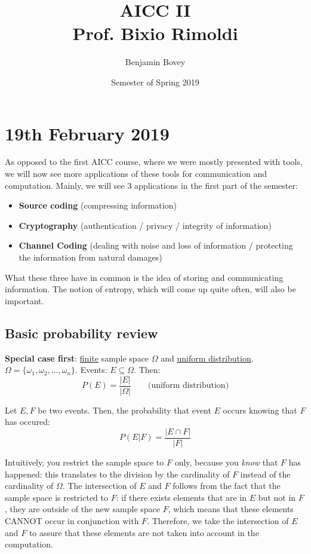 \documentclass{report}
\title{AICC II \\ Prof. Bixio Rimoldi}
\author{Benjamin Bovey}
\date{Semester of Spring 2019}
\begin{document}
\maketitle


\section{19th February 2019}
As opposed to the first AICC course, where we were mostly presented with tools, we will now see more applications of these tools for communication and computation. Mainly, we will see 3 applications in the first part of the semester:
\begin{itemize}
	\item \textbf{Source coding} (compressing information)
	\item \textbf{Cryptography} (authentication / privacy / integrity of information)
	\item \textbf{Channel Coding} (dealing with noise and loss of information / protecting the information from natural damages)
\end{itemize}
What these three have in common is the idea of storing and communicating information. The notion of entropy, which will come up quite often, will also be important.

\subsection{Basic probability review}
\textbf{Special case first}: \underline{finite} sample space $\Omega$ and \underline{uniform distribution}. $\Omega = \{\omega_1, \omega_2, \dots, \omega_n\}$. Events: $E \subseteq \Omega$. Then:
\begin{equation}
	P(E) = \dfrac{|E|}{|\Omega|} \qquad \text{(uniform distribution)}
\end{equation}

\begin{defn}
Let $E, F$ be two events. Then, the probability that event $E$ occurs knowing that $F$ has occured:
\begin{equation}
	P(E|F) = \dfrac{|E \cap F|}{|F|}
\end{equation}
\end{defn}
Intuitively, you restrict the sample space to $F$ only, because you \emph{know} that $F$ has happened: this translates to the division by the cardinality of $F$ instead of the cardinality of $\Omega$. The intersection of $E$ and $F$ follows from the fact that the sample space is restricted to $F$: if there exists elements that are in $E$ but not in $F$, they are outside of the new sample space $F$, which means that these elements CANNOT occur in conjunction with $F$. Therefore, we take the intersection of $E$ and $F$ to assure that these elements are not taken into account in the computation.
\end{document}
